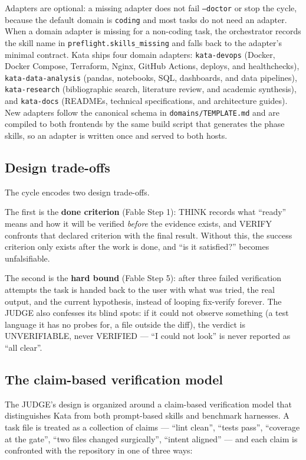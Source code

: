 \documentclass{sbc2019}%
\begin{document}
Adapters are optional: a missing adapter does not fail \texttt{--doctor}
or stop the cycle, because the default domain is \texttt{coding} and most
tasks do not need an adapter. When a domain adapter is missing for a
non-coding task, the orchestrator records the skill name in
\texttt{preflight.skills\_missing} and falls back to the adapter's minimal
contract. Kata ships four domain adapters: \texttt{kata-devops} (Docker,
Docker Compose, Terraform, Nginx, GitHub Actions, deploys, and
healthchecks), \texttt{kata-data-analysis} (pandas, notebooks, SQL,
dashboards, and data pipelines), \texttt{kata-research} (bibliographic
search, literature review, and academic synthesis), and \texttt{kata-docs}
(READMEs, technical specifications, and architecture guides). New adapters
follow the canonical schema in \texttt{domains/TEMPLATE.md} and are
compiled to both frontends by the same build script that generates the
phase skills, so an adapter is written once and served to both hosts.

\subsection{Design trade-offs}

The cycle encodes two design trade-offs.

The first is the \textbf{done criterion} (Fable Step 1): THINK records what
``ready'' means and how it will be verified \emph{before} the evidence
exists, and VERIFY confronts that declared criterion with the final result.
Without this, the success criterion only exists after the work is done, and
``is it satisfied?'' becomes unfalsifiable.

The second is the \textbf{hard bound} (Fable Step 5): after three failed
verification attempts the task is handed back to the user with what was
tried, the real output, and the current hypothesis, instead of looping
fix-verify forever. The JUDGE also confesses its blind spots: if it could
not observe something (a test language it has no probes for, a file outside
the diff), the verdict is UNVERIFIABLE, never VERIFIED --- ``I could not
look'' is never reported as ``all clear''.

\subsection{The claim-based verification model}

The JUDGE's design is organized around a claim-based verification model
that distinguishes Kata from both prompt-based skills and benchmark
harnesses. A task file is treated as a collection of claims --- ``lint
clean'', ``tests pass'', ``coverage at the gate'', ``two files changed
surgically'', ``intent aligned'' --- and each claim is confronted with the
repository in one of three ways:
\end{document}
